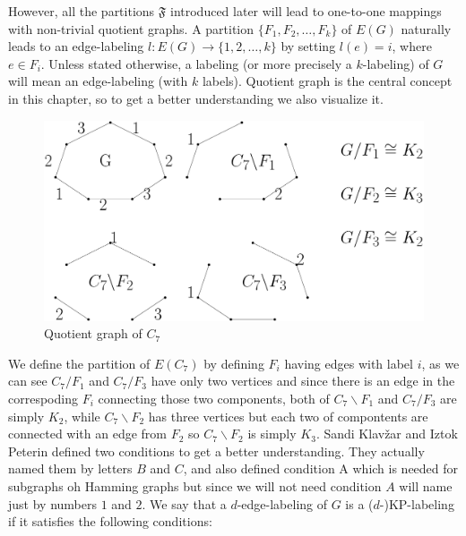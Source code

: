 \documentclass[12pt,a4paper,titlepage,openany]{report}
\begin{document}
 However, all the partitions $\mathfrak{F}$ introduced later will lead to one-to-one mappings with non-trivial quotient graphs.\newline
A partition $\{F_1,F_2,\ldots ,F_k\}$ of $E(G)$ naturally leads to an edge-labeling $l:E(G)\to \{1,2,\ldots,k\}$ by setting $l(e)=i$, where $e\in F_i$. Unless stated
otherwise, a labeling (or more precisely a $k$-labeling) of $G$ will mean an edge-labeling (with $k$ labels).
\newline 
Quotient graph is the central concept in this chapter, so to get a better understanding we also visualize it.
\begin{figure}[h!]
\begin{center}
\includegraphics[width=1\linewidth]{figures/quotientgraph.png}
\end{center}
\caption{Quotient graph of $C_7$}
\end{figure}
We define the partition of $E(C_7)$ by defining $F_i$ having edges with label $i$, as we can see $C_7/ F_1$ and $C_7/F_3$ have only two vertices and since there is an edge in the correspoding $F_i$ connecting those two components, both of  $C_7\backslash F_1$ and $C_7/F_3$ are simply $K_2$, while $C_7\backslash F_2$ has three vertices but each two of compontents are connected with an edge from $F_2$ so $C_7\backslash F_2$ is simply $K_3$.   
\newline
Sandi Klav\v zar and Iztok Peterin defined two conditions to get a better understanding. They actually named them by letters $B$ and $C$, and also defined condition A which is needed for subgraphs oh Hamming graphs but since we will not need condition $A$ will name just by numbers $1$ and $2$.\newline
We say that a $d$-edge-labeling of $G$ is a ($d$-)KP-labeling if it satisfies the following conditions:
\newline
\end{document}
